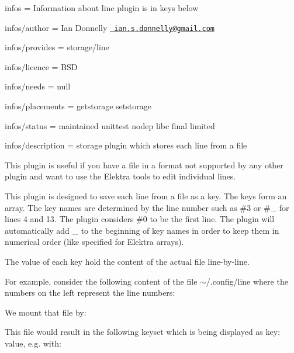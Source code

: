 
\begin{DoxyItemize}
\item infos = Information about line plugin is in keys below
\item infos/author = Ian Donnelly \href{mailto:ian.s.donnelly@gmail.com}{\texttt{ ian.\+s.\+donnelly@gmail.\+com}}
\item infos/provides = storage/line
\item infos/licence = B\+SD
\item infos/needs = null
\item infos/placements = getstorage setstorage
\item infos/status = maintained unittest nodep libc final limited
\item infos/description = storage plugin which stores each line from a file
\end{DoxyItemize}

This plugin is useful if you have a file in a format not supported by any other plugin and want to use the Elektra tools to edit individual lines.

This plugin is designed to save each line from a file as a key. The keys form an array. The key names are determined by the line number such as {\ttfamily \#3} or {\ttfamily \#\+\_} for lines 4 and 13. The plugin considers {\ttfamily \#0} to be the first line. The plugin will automatically add {\ttfamily \+\_\+} to the beginning of key names in order to keep them in numerical order (like specified for Elektra arrays).

The value of each key hold the content of the actual file line-\/by-\/line.

For example, consider the following content of the file {\ttfamily $\sim$/.config/line} where the numbers on the left represent the line numbers\+:


\begin{DoxyCode}{0}
\end{DoxyCode}


We mount that file by\+:


\begin{DoxyCode}{0}
\end{DoxyCode}


This file would result in the following keyset which is being displayed as {\ttfamily key\+: value}, e.\+g. with\+:


